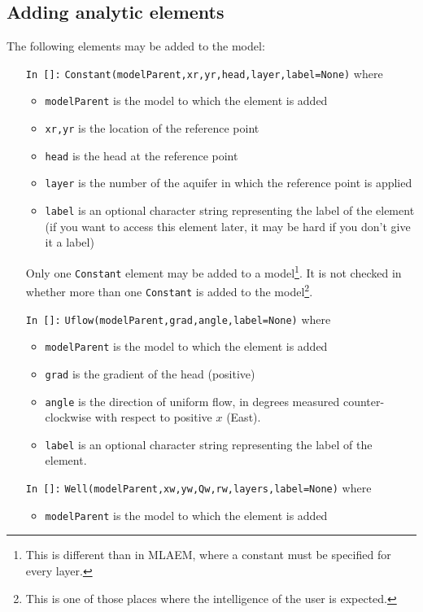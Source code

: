 \documentclass [10pt,letterpaper] {article}
\begin{document}
\subsection{Adding analytic elements}
The following elements may be added to the model:
\begin{itemize}
\item[{\tt In []:}] {\tt Constant(modelParent,xr,yr,head,layer,label=None)} where
    \begin{itemize}
     \item {\tt modelParent} is the model to which the element is
    added
    \item {\tt xr,yr} is the location of the reference point
    \item {\tt head} is the head at the reference point
    \item {\tt layer} is the number of the aquifer in which the reference point is applied
    \item {\tt label} is an optional character string representing the label of the element
    (if you want to access this element later, it may be hard if you don't give it a label)
    \end{itemize}
    Only one {\tt Constant} element may be added to a model\footnote{This is different than in MLAEM, where
    a constant must be specified for every layer.}. It is not
    checked in \Timsp whether more than one {\tt Constant} is
    added to the model\footnote{This is one of those places where the
    intelligence of the user is expected.}.
\item[{\tt In []:}] {\tt Uflow(modelParent,grad,angle,label=None)} where
    \begin{itemize}
     \item {\tt modelParent} is the model to which the element is
    added
    \item {\tt grad} is the gradient of the head (positive)
    \item {\tt angle} is the direction of uniform flow, in degrees measured counter-clockwise with respect to positive
    $x$ (East).
    \item {\tt label} is an optional character string representing the label of the element.
    \end{itemize}
\item[{\tt In []:}] {\tt Well(modelParent,xw,yw,Qw,rw,layers,label=None)} where
    \begin{itemize}
    \item {\tt modelParent} is the model to which the element is
    added

\end{itemize}
\end{itemize}
\end{document}

